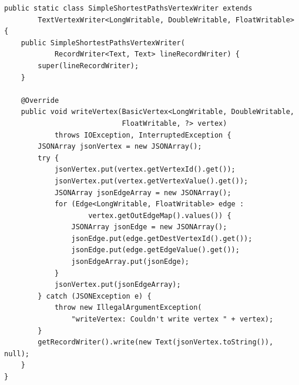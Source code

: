 \begin{lstlisting}[float]
public static class SimpleShortestPathsVertexWriter extends
        TextVertexWriter<LongWritable, DoubleWritable, FloatWritable> {
    public SimpleShortestPathsVertexWriter(
            RecordWriter<Text, Text> lineRecordWriter) {
        super(lineRecordWriter);
    }

    @Override
    public void writeVertex(BasicVertex<LongWritable, DoubleWritable,
                            FloatWritable, ?> vertex)
            throws IOException, InterruptedException {
        JSONArray jsonVertex = new JSONArray();
        try {
            jsonVertex.put(vertex.getVertexId().get());
            jsonVertex.put(vertex.getVertexValue().get());
            JSONArray jsonEdgeArray = new JSONArray();
            for (Edge<LongWritable, FloatWritable> edge :
                    vertex.getOutEdgeMap().values()) {
                JSONArray jsonEdge = new JSONArray();
                jsonEdge.put(edge.getDestVertexId().get());
                jsonEdge.put(edge.getEdgeValue().get());
                jsonEdgeArray.put(jsonEdge);
            }
            jsonVertex.put(jsonEdgeArray);
        } catch (JSONException e) {
            throw new IllegalArgumentException(
                "writeVertex: Couldn't write vertex " + vertex);
        }
        getRecordWriter().write(new Text(jsonVertex.toString()), null);
    }
}
\end{lstlisting}